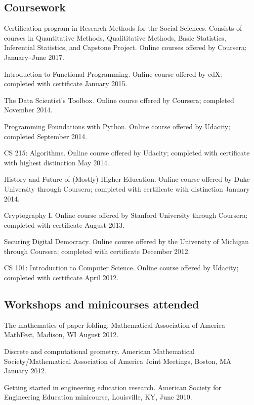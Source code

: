 \documentclass[letterpaper]{article}
\renewenvironment{itemize}{
  \begin{list}{}{
    \setlength{\leftmargin}{1.5em}
	\setlength{\itemsep}{0in}
  }
}{
  \end{list}
}
\begin{document}
\subsection*{Coursework}
\begin{itemize}
  \item Certification program in Research Methods for the Social Sciences. Consists of courses in Quantitative Methods, Qualititative Methods, Basic Statistics, Inferential Statistics, and Capstone Project. Online courses offered by Coursera; January--June 2017.
	\item Introduction to Functional Programming. Online course offered by edX; completed with certificate January 2015.
	\item The Data Scientist's Toolbox. Online course offered by Coursera; completed November 2014.
	\item Programming Foundations with Python. Online course offered by Udacity; completed September 2014.
	\item CS 215: Algorithms. Online course offered by Udacity; completed with certificate with highest distinction May 2014.
	\item History and Future of (Mostly) Higher Education. Online course offered by Duke University through Coursera; completed with certificate with distinction January 2014.
	\item Cryptography I. Online course offered by Stanford University through Coursera; completed with certificate August 2013.
	\item Securing Digital Democracy. Online course offered by the University of Michigan through Coursera; completed with certificate December 2012.
	\item CS 101: Introduction to Computer Science. Online course offered by Udacity; completed with certificate April 2012.
\end{itemize}


\subsection*{Workshops and minicourses attended}

\begin{itemize}
	\item The mathematics of paper folding. Mathematical Association of America MathFest, Madison, WI August 2012.
	\item Discrete and computational geometry. American Mathematical Society/Mathematical Association of America Joint Meetings, Boston, MA January 2012.
	\item Getting started in engineering education research. American Society for Engineering Education minicourse, Louisville, KY, June 2010.
\end{itemize}
\end{document}
